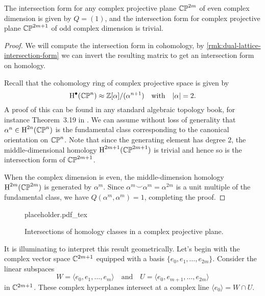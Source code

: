 \begin{proposition}\label{prop:intersection-form-complex-projective-plane}
	The intersection form for any complex projective plane $\mathbb{CP}^{2m}$ of even complex dimension is given by $Q=(1)$, and the intersection form for complex projective plane $\mathbb{CP}^{2m+1}$ of odd complex dimension is trivial.
\end{proposition}
\begin{proof}
	We will compute the intersection form in cohomology, by \cref{rmk:dual-lattice-intersection-form} we can invert the resulting matrix to get an intersection form on homology.

	Recall that the cohomology ring of complex projective space is given by
	\begin{equation}
		\operatorname{H}^\bullet(\mathbb{CP}^{n}) \approx \mathbb{Z}[\alpha]/(\alpha^{n+1})\quad\textrm{with}\quad |\alpha|=2.
	\end{equation}
	A proof of this can be found in any standard algebraic topology book, for instance Theorem~3.19 in \cite{hatcher2002topology}. We can assume without loss of generality that $\alpha^n\in \operatorname{H}^{2n}(\mathbb{CP}^n)$ is the fundamental class corresponding to the canonical orientation on $\mathbb{CP}^n$.
	Note that since the generating element has degree $2$, the middle-dimensional homology $\operatorname{H}^{2m+1}(\mathbb{CP}^{2m+1})$ is trivial and hence so is the intersection form of $\mathbb{CP}^{2m+1}$.

	When the complex dimension is even, the middle-dimension homology $\operatorname{H}^{2m}(\mathbb{CP}^{2m})$ is generated by $\alpha^m$. Since $\alpha^m\smile \alpha^m=\alpha^{2m}$ is a unit multiple of the fundamental class, we have $Q(\alpha^m, \alpha^m)=1$, completing the proof.
\end{proof}

\begin{figure}[ht]
	\centering
	{placeholder.pdf_tex}
	\caption{Intersections of homology classes in a complex projective plane.}\label{fig:geometric-intersection-complex-projective}
\end{figure}

It is illuminating to interpret this result geometrically. Let's begin with the complex vector space $\mathbb{C}^{2m+1}$ equipped with a basis $\{e_0, e_1,\ldots, e_{2m}\}$. Consider the linear subspaces
\begin{equation}
	W = \langle e_0, e_1,\ldots, e_m\rangle \quad\textrm{and}\quad U = \langle e_0, e_{m+1},\ldots, e_{2m}\rangle
\end{equation}
in $\mathbb{C}^{2m+1}$. These complex hyperplanes intersect at a complex line $\langle e_0 \rangle = W\cap U$.

